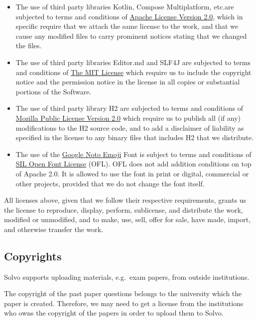 \documentclass[a4paper]{article}
\begin{document}
    \begin{itemize}
        \item The use of third party libraries Kotlin, Compose Multiplatform, etc.\@ are subjected to terms and conditions of \href{http://www.apache.org/licenses/LICENSE-2.0}{Apache License Version 2.0}, which in specific require that we attach the same license to the work, and that we cause any modified files to carry prominent notices stating that we changed the files.
        \item The use of third party libraries Editor.md and SLF4J are subjected to terms and conditions of \href{https://mit-license.org/}{The MIT License} which require us to include the copyright notice and the permission notice in the license in all copies or substantial portions of the Software.
        \item The use of third party library H2 are subjected to terms and conditions of \href{https://www.mozilla.org/en-US/MPL/2.0/}{Mozilla Public License Version 2.0} which require us to publish all (if any) modifications to the H2 source code, and to add a disclaimer of liability as specified in the license to any binary files that includes H2 that we distribute.
        \item The use of the \href{https://fonts.google.com/noto/specimen/Noto+Emoji}{Google Noto Emoji} Font is subject to terms and conditions of \href{https://scripts.sil.org/cms/scripts/page.php?site_id=nrsi&id=OFL}{SIL Open Font License} (OFL).
        OFL does not add addition conditions on top of Apache 2.0. It is allowed to use the font in print or digital, commercial or other projects, provided that we do not change the font itself.
    \end{itemize}

    All licenses above, given that we follow their respective requirements, grants us the license to reproduce, display, perform, sublicense, and distribute the work, modified or unmodified, and to make, use, sell, offer for sale, have made, import, and otherwise transfer the work.

    \vspace*{-1em}

    \subsection*{Copyrights}

    Solvo supports uploading materials, e.g.\ exam papers, from outside institutions.

    The copyright of the past paper questions belongs to the university which the paper is created.
    Therefore, we may need to get a license from the institutions who owns the copyright of the papers in order to upload them to Solvo.
\end{document}
